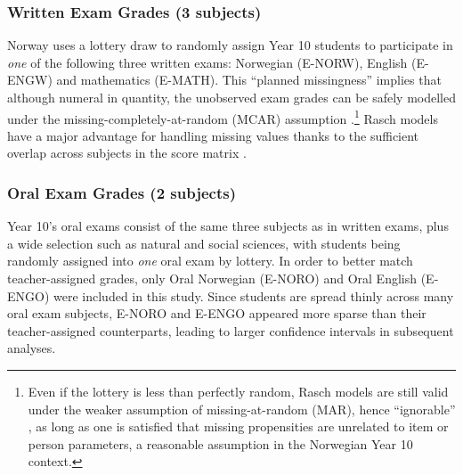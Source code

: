 \subsubsection{Written Exam Grades (3 subjects)}

Norway uses a lottery draw to randomly assign Year 10 students to participate in \emph{one} of the following three written exams: Norwegian (E-NORW), English (E-ENGW) and mathematics (E-MATH). This ``planned missingness'' implies that although numeral in quantity, the unobserved exam grades can be safely modelled under the missing-completely-at-random (MCAR) assumption \parencite{little:2019}.\footnote{Even if the lottery is less than perfectly random, Rasch models are still valid under the weaker assumption of missing-at-random (MAR), hence ``ignorable'' \parencite{molenaar:1995}, as long as one is satisfied that missing propensities are unrelated to item or person parameters, a reasonable assumption in the Norwegian Year 10 context.} Rasch models have a major advantage for handling missing values thanks to the sufficient overlap across subjects in the score matrix \parencite{he:2018}.

\subsubsection{Oral Exam Grades (2 subjects)}

Year 10's oral exams consist of the same three subjects as in written exams, plus a wide selection such as natural and social sciences, with students being randomly assigned into \emph{one} oral exam by lottery. In order to better match teacher-assigned grades, only Oral Norwegian (E-NORO) and Oral English (E-ENGO) were included in this study. Since students are spread thinly across many oral exam subjects, E-NORO and E-ENGO appeared more sparse than their teacher-assigned counterparts, leading to larger confidence intervals in subsequent analyses.
